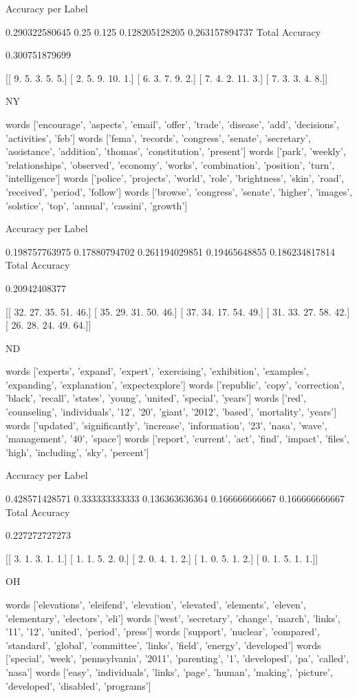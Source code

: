 \documentclass[11pt]{article}
\begin{document}
\begin{verbatium}
Accuracy per Label

0.290322580645
0.25
0.125
0.128205128205
0.263157894737
Total Accuracy

0.300751879699


[[  9.   5.   3.   5.   5.]
 [  2.   5.   9.  10.   1.]
 [  6.   3.   7.   9.   2.]
 [  7.   4.   2.  11.   3.]
 [  7.   3.   3.   4.   8.]]


NY


words
['encourage', 'aspects', 'email', 'offer', 'trade', 'disease', 'add', 'decisions', 'activities', 'feb']
words
['fema', 'records', 'congress', 'senate', 'secretary', 'assistance', 'addition', 'thomas', 'constitution', 'present']
words
['park', 'weekly', 'relationships', 'observed', 'economy', 'works', 'combination', 'position', 'turn', 'intelligence']
words
['police', 'projects', 'world', 'role', 'brightness', 'skin', 'road', 'received', 'period', 'follow']
words
['browse', 'congress', 'senate', 'higher', 'images', 'solstice', 'top', 'annual', 'cassini', 'growth']

Accuracy per Label

0.198757763975
0.17880794702
0.261194029851
0.19465648855
0.186234817814
Total Accuracy

0.20942408377


[[ 32.  27.  35.  51.  46.]
 [ 35.  29.  31.  50.  46.]
 [ 37.  34.  17.  54.  49.]
 [ 31.  33.  27.  58.  42.]
 [ 26.  28.  24.  49.  64.]]


ND


words
['experts', 'expand', 'expert', 'exercising', 'exhibition', 'examples', 'expanding', 'explanation', 'expectexplore']
words
['republic', 'copy', 'correction', 'black', 'recall', 'states', 'young', 'united', 'special', 'years']
words
['red', 'counseling', 'individuals', '12', '20', 'giant', '2012', 'based', 'mortality', 'years']
words
['updated', 'significantly', 'increase', 'information', '23', 'nasa', 'wave', 'management', '40', 'space']
words
['report', 'current', 'act', 'find', 'impact', 'files', 'high', 'including', 'sky', 'percent']

Accuracy per Label

0.428571428571
0.333333333333
0.136363636364
0.166666666667
0.166666666667
Total Accuracy

0.227272727273


[[ 3.  1.  3.  1.  1.]
 [ 1.  1.  5.  2.  0.]
 [ 2.  0.  4.  1.  2.]
 [ 1.  0.  5.  1.  2.]
 [ 0.  1.  5.  1.  1.]]


OH


words
['elevations', 'eleifend', 'elevation', 'elevated', 'elements', 'eleven', 'elementary', 'electors', 'eli']
words
['west', 'secretary', 'change', 'march', 'links', '11', '12', 'united', 'period', 'press']
words
['support', 'nuclear', 'compared', 'standard', 'global', 'committee', 'links', 'field', 'energy', 'developed']
words
['special', 'week', 'pennsylvania', '2011', 'parenting', '1', 'developed', 'pa', 'called', 'nasa']
words
['easy', 'individuals', 'links', 'page', 'human', 'making', 'picture', 'developed', 'disabled', 'programs']


\end{verbatium}
\end{document}
